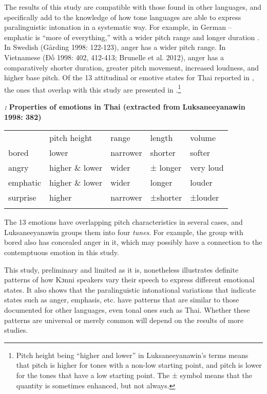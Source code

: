 \documentclass[output=paper]{langsci/langscibook}
\begin{document}
The results of this study are compatible with those found in other languages, and specifically add to the knowledge of how tone languages are able to express paralinguistic intonation in a systematic way. For example, in German – emphatic is “more of everything,” with a wider pitch range and longer duration \citep[91]{Gibbon1998}.  In Swedish (Gårding 1998: 122-123), anger has a wider pitch range. In Vietnamese (Đố 1998: 402, 412-413; Brunelle et al. 2012), anger has a comparatively shorter duration, greater pitch movement, increased loudness, and higher base pitch. Of the 13 attitudinal or emotive states for Thai reported in \citet[382]{Luksaneeyanawin1998}, the ones that overlap with this study are presented in .\footnote{ Pitch height being “higher and lower” in Luksaneeyanawin’s terms means that pitch is higher for tones with a non-low starting point, and pitch is lower for the tones that have a low starting point. The ± symbol means that the quantity is sometimes enhanced, but not always.}

\emph{\textbf{\textup{:}}}\textbf{ Properties of emotions in Thai (extracted from }\textbf{Luksaneeyanawin 1998: 382)}

\begin{tabular}{lllll} & pitch height & range & length & volume\\
\lsptoprule
bored & lower & narrower & shorter & softer\\
angry & higher \& lower & wider & ± longer & very loud\\
emphatic & higher \& lower & wider & longer & louder\\
surprise & higher & narrower & ±shorter & ±louder\\
\lspbottomrule
\end{tabular}
The 13 emotions have overlapping pitch characteristics in several cases, and Luksaneeyanawin groups them into four \emph{tunes}. For example, the group with bored also has concealed anger in it, which may possibly have a connection to the contemptuous emotion in this study.

This study, preliminary and limited as it is, nonetheless illustrates definite patterns of how Kɔnni speakers vary their speech to express different emotional states. It also shows that the paralinguistic intonational variations that indicate states such as anger, emphasis, etc. have patterns that are similar to those documented for other languages, even tonal ones such as Thai. Whether these patterns are universal or merely common will depend on the results of more studies.
\end{document}
